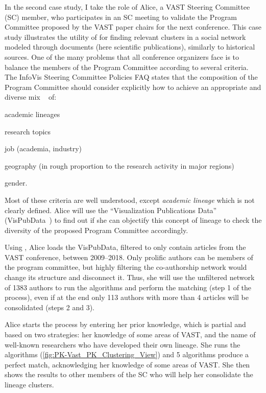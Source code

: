 In the second case study, I take the role of Alice, a VAST Steering Committee (SC) member, who participates in an SC meeting to validate the Program Committee proposed by the VAST paper chairs for the next conference.
This case study illustrates the utility of \pkclustering for finding relevant clusters in a social network modeled through documents (here scientific publications), similarly to historical sources.
One of the many problems that all conference organizers face is to balance the members of the Program Committee according to several criteria.
The InfoVis Steering Committee Policies FAQ states that the composition of the Program Committee should consider explicitly how to achieve an appropriate and diverse mix ~\cite{infovisfaq} of:
\begin{itemize*}
\item academic lineages
\item research topics
\item job (academia, industry)
\item geography (in rough proportion to the research activity in major regions)
\item gender.
\end{itemize*}
Most of these criteria are well understood, except \emph{academic lineage} which is not clearly defined.
Alice will use the ``Visualization Publications Data'' (VisPubData~\cite{isenbergVispubdataOrgMetadata2017}) to find out if she can objectify this concept of lineage to check the diversity of the proposed Program Committee accordingly.

Using \pkclustering, Alice loads the VisPubData, filtered to only contain articles from the VAST conference, between 2009--2018. Only prolific authors can be members of the program committee, but highly filtering the co-authorship network  would change its structure and disconnect it. Thus, she will use the unfiltered network of 1383 authors to run the algorithms and perform the matching (step 1 of the process), even if at the end only 113 authors with more than 4 articles will be consolidated (steps 2 and 3).

Alice starts the \pkclustering process by entering her prior knowledge, which is partial and based on two strategies: her knowledge of some areas of VAST, and the name of well-known researchers who have developed their own lineage. She runs the algorithms (\autoref{fig:PK-Vast_PK_Clustering_View}) and 5 algorithms produce a perfect match, acknowledging her knowledge of some areas of VAST. She then shows the results to other members of the SC who will help her consolidate the lineage clusters.

